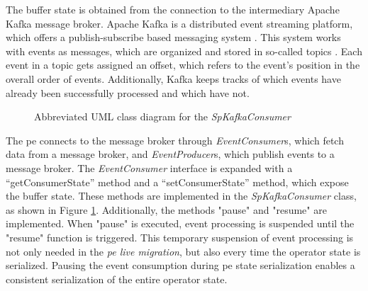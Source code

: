 The buffer state is obtained from the connection to the intermediary Apache Kafka message broker. Apache Kafka is a distributed event streaming platform, which offers a publish-subscribe based messaging system \cite{apacheKafka.2020}. This system works with events as messages, which are organized and stored in so-called topics \cite{apacheKafka.2020}. Each event in a topic gets assigned an offset, which refers to the event's position in the overall order of events. Additionally, Kafka keeps tracks of which events have already been successfully processed and which have not.\\
\begin{figure}[!b]
    \centering
    \caption{Abbreviated UML class diagram for the \textit{SpKafkaConsumer}}
    \label{fKafkaConsumerUML}
\end{figure}
The \gls{pe} connects to the message broker through \textit{EventConsumer}s, which fetch data from a message broker, and \textit{EventProducer}s, which publish events to a message broker. The \textit{EventConsumer} interface is expanded with a “getConsumerState” method and a “setConsumerState” method, which expose the buffer state. These methods are implemented in the \textit{SpKafkaConsumer} class, as shown in Figure \ref{fKafkaConsumerUML}. Additionally, the methods "pause" and "resume" are implemented. When "pause" is executed, event processing is suspended until the "resume" function is triggered. This temporary suspension of event processing is not only needed in the \textit{\acrshort{pe} live migration}, but also every time the operator state is serialized. Pausing the event consumption during \gls{pe} state serialization enables a consistent serialization of the entire operator state.\\
